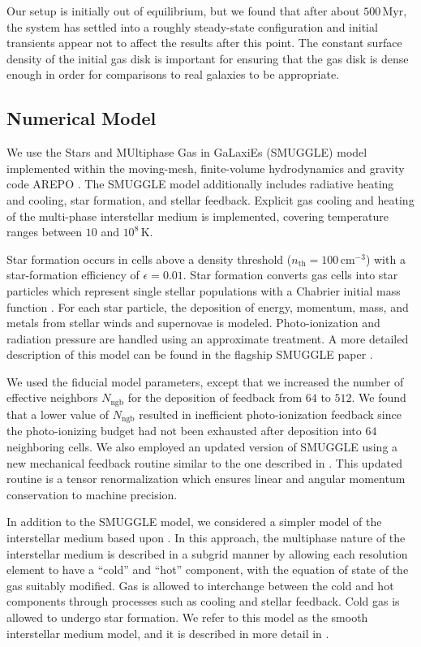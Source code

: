 \documentclass[fleqn,usenatbib]{mnras}
\newcommand{\AREPO}{\textsc{AREPO}}
\begin{document}
Our setup is initially out of equilibrium, but we found that after about
$500\,\textrm{Myr}$, the system has settled into a roughly steady-state
configuration and initial transients appear not to affect the results after this
point. The constant surface density of the initial gas disk is important for
ensuring that the gas disk is dense enough in order for comparisons to real
galaxies to be appropriate.

\subsection{Numerical Model}
We use the Stars and MUltiphase Gas in GaLaxiEs (SMUGGLE) model
\citep{2019MNRAS.489.4233M} implemented within the moving-mesh, finite-volume
hydrodynamics and gravity code \AREPO{} \citep{2010MNRAS.401..791S}. The SMUGGLE
model additionally includes radiative heating and cooling, star formation, and
stellar feedback. Explicit gas cooling and heating of the multi-phase
interstellar medium is implemented, covering temperature ranges between $10$ and
$10^8\,\textrm{K}$.

Star formation occurs in cells above a density threshold
($n_{\textrm{th}}=100\,\textrm{cm}^{-3}$) with a star-formation efficiency of
$\epsilon = 0.01$. Star formation converts gas cells into star particles which
represent single stellar populations with a Chabrier initial mass function
\citep{2003PASP..115..763C}. For each star particle, the deposition of energy,
momentum, mass, and metals from stellar winds and supernovae is modeled.
Photo-ionization and radiation pressure are handled using an approximate
treatment. A more detailed description of this model can be found in the
flagship SMUGGLE paper \citep{2019MNRAS.489.4233M}.

We used the fiducial model parameters, except that we increased the number of
effective neighbors $N_{\textrm{ngb}}$ for the deposition of feedback from $64$
to $512$. We found that a lower value of $N_{\textrm{ngb}}$ resulted in
inefficient photo-ionization feedback since the photo-ionizing budget had not
been exhausted after deposition into $64$ neighboring cells. We also employed an
updated version of SMUGGLE using a new mechanical feedback routine similar to
the one described in \citet{2018MNRAS.480..800H}. This updated routine is a
tensor renormalization which ensures linear and angular momentum conservation to
machine precision.

In addition to the SMUGGLE model, we considered a simpler model of the
interstellar medium based upon \citet{2003MNRAS.339..289S}. In this approach,
the multiphase nature of the interstellar medium is described in a subgrid
manner by allowing each resolution element to have a ``cold'' and ``hot''
component, with the equation of state of the gas suitably modified. Gas is
allowed to interchange between the cold and hot components through processes
such as cooling and stellar feedback. Cold gas is allowed to undergo star
formation. We refer to this model as the smooth interstellar medium model, and
it is described in more detail in \citet{2019MNRAS.489.4233M}.
\end{document}
